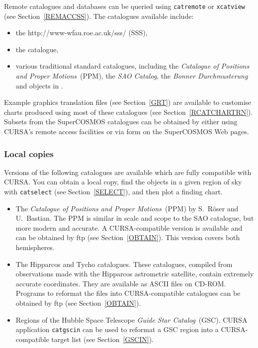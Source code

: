 \documentclass[twoside,11pt]{starlink}
\begin{document}
Remote catalogues and databases can be queried using \texttt{catremote} or
\texttt{xcatview} (see Section~\ref{REMACCSS}).  The catalogues available
include:

\begin{itemize}

  \item the 
   {http://www-wfau.roe.ac.uk/sss/} (SSS),

  \item the 
   catalogue\cite{PMM},

  \item various traditional standard catalogues, including the \textit{Catalogue of Positions and Proper Motions}\, (PPM)\cite{PPMN, PPMS},
   the \textit{SAO Catalog}, the \textit{Bonner Durchmusterung}\, and objects
   in .

\end{itemize}

Example graphics translation files (see Section~\ref{GRT}) are available
to customise charts produced using most of these catalogues (see
Section~\ref{RCATCHARTRN}).  Subsets from the SuperCOSMOS catalogues can
be obtained by either using CURSA's remote access facilities or via form
on the SuperCOSMOS Web pages.

\subsubsection{Local copies}

Versions of the following catalogues are available which are fully
compatible with CURSA.  You can obtain a local copy, find the objects in
a given region of sky with \texttt{catselect} (see Section~\ref{SELECT}), and
then plot a finding chart.

\begin{itemize}

  \item The \textit{Catalogue of Positions and Proper Motions}\, (PPM)
   by S.~R\"{o}ser and U.~Bastian\cite{PPMN, PPMS}.  The PPM
   is similar in scale and scope to the SAO catalogue, but more modern
   and accurate.  A CURSA-compatible version is available and can be
   obtained by ftp (see Section~\ref{OBTAIN}).  This version covers both
   hemispheres.

  \item The Hipparcos and Tycho catalogues.  These catalogues, compiled
   from observations made with the Hipparcos astrometric satellite,
   contain extremely accurate coordinates.  They are available as
   ASCII files on CD-ROM.  Programs to reformat the files into
   CURSA-compatible catalogues can be obtained by ftp (see
   Section~\ref{OBTAIN}).

  \item Regions of the Hubble Space Telescope \textit{Guide Star
   Catalog}\, (GSC).  CURSA application \texttt{catgscin} can be used to
   reformat a GSC region into a CURSA-compatible target list (see
   Section~\ref{GSCIN}).

\end{itemize}
\end{document}
